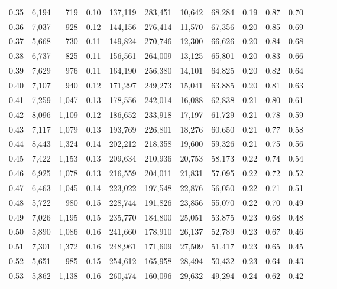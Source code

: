 \begin{tabular}{rrrrrrrrrrrrrr}
0.35 &  6,194 &    719 &  0.10 &  137,119 &  283,451 &  10,642 &  68,284 &  0.19 &  0.87 &      0.70 \\
0.36 &  7,037 &    928 &  0.12 &  144,156 &  276,414 &  11,570 &  67,356 &  0.20 &  0.85 &      0.69 \\
0.37 &  5,668 &    730 &  0.11 &  149,824 &  270,746 &  12,300 &  66,626 &  0.20 &  0.84 &      0.68 \\
0.38 &  6,737 &    825 &  0.11 &  156,561 &  264,009 &  13,125 &  65,801 &  0.20 &  0.83 &      0.66 \\
0.39 &  7,629 &    976 &  0.11 &  164,190 &  256,380 &  14,101 &  64,825 &  0.20 &  0.82 &      0.64 \\
0.40 &  7,107 &    940 &  0.12 &  171,297 &  249,273 &  15,041 &  63,885 &  0.20 &  0.81 &      0.63 \\
0.41 &  7,259 &  1,047 &  0.13 &  178,556 &  242,014 &  16,088 &  62,838 &  0.21 &  0.80 &      0.61 \\
0.42 &  8,096 &  1,109 &  0.12 &  186,652 &  233,918 &  17,197 &  61,729 &  0.21 &  0.78 &      0.59 \\
0.43 &  7,117 &  1,079 &  0.13 &  193,769 &  226,801 &  18,276 &  60,650 &  0.21 &  0.77 &      0.58 \\
0.44 &  8,443 &  1,324 &  0.14 &  202,212 &  218,358 &  19,600 &  59,326 &  0.21 &  0.75 &      0.56 \\
0.45 &  7,422 &  1,153 &  0.13 &  209,634 &  210,936 &  20,753 &  58,173 &  0.22 &  0.74 &      0.54 \\
0.46 &  6,925 &  1,078 &  0.13 &  216,559 &  204,011 &  21,831 &  57,095 &  0.22 &  0.72 &      0.52 \\
0.47 &  6,463 &  1,045 &  0.14 &  223,022 &  197,548 &  22,876 &  56,050 &  0.22 &  0.71 &      0.51 \\
0.48 &  5,722 &    980 &  0.15 &  228,744 &  191,826 &  23,856 &  55,070 &  0.22 &  0.70 &      0.49 \\
0.49 &  7,026 &  1,195 &  0.15 &  235,770 &  184,800 &  25,051 &  53,875 &  0.23 &  0.68 &      0.48 \\
0.50 &  5,890 &  1,086 &  0.16 &  241,660 &  178,910 &  26,137 &  52,789 &  0.23 &  0.67 &      0.46 \\
0.51 &  7,301 &  1,372 &  0.16 &  248,961 &  171,609 &  27,509 &  51,417 &  0.23 &  0.65 &      0.45 \\
0.52 &  5,651 &    985 &  0.15 &  254,612 &  165,958 &  28,494 &  50,432 &  0.23 &  0.64 &      0.43 \\
0.53 &  5,862 &  1,138 &  0.16 &  260,474 &  160,096 &  29,632 &  49,294 &  0.24 &  0.62 &      0.42 \\

\end{tabular}
